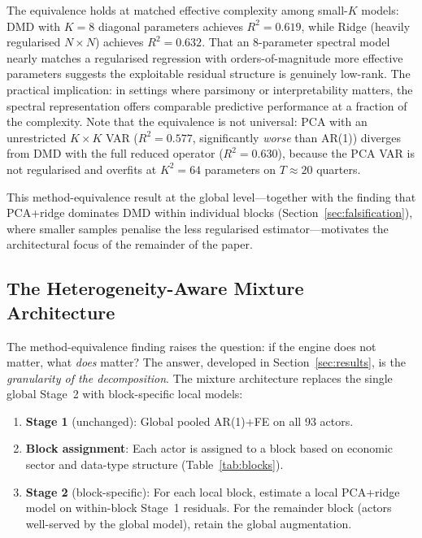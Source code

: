 \documentclass[11pt,a4paper]{article}
\begin{document}
The equivalence holds at matched effective complexity among small-$K$ models: DMD with $K = 8$ diagonal parameters achieves $R^2 = 0.619$, while Ridge (heavily regularised $N \!\times\! N$) achieves $R^2 = 0.632$. That an 8-parameter spectral model nearly matches a regularised regression with orders-of-magnitude more effective parameters suggests the exploitable residual structure is genuinely low-rank. The practical implication: in settings where parsimony or interpretability matters, the spectral representation offers comparable predictive performance at a fraction of the complexity. Note that the equivalence is not universal: PCA with an unrestricted $K \!\times\! K$ VAR ($R^2 = 0.577$, significantly \emph{worse} than AR(1)) diverges from DMD with the full reduced operator ($R^2 = 0.630$), because the PCA VAR is not regularised and overfits at $K^2 = 64$ parameters on $T \approx 20$ quarters.

This method-equivalence result at the global level---together with the finding that PCA+ridge dominates DMD within individual blocks (Section~\ref{sec:falsification}), where smaller samples penalise the less regularised estimator---motivates the architectural focus of the remainder of the paper.

\subsection{The Heterogeneity-Aware Mixture Architecture}
\label{sec:mixture_arch}

The method-equivalence finding raises the question: if the engine does not matter, what \emph{does} matter? The answer, developed in Section~\ref{sec:results}, is the \emph{granularity of the decomposition}. The mixture architecture replaces the single global Stage~2 with block-specific local models:

\begin{enumerate}[nosep]
  \item \textbf{Stage 1} (unchanged): Global pooled AR(1)+FE on all 93 actors.
  \item \textbf{Block assignment}: Each actor is assigned to a block based on economic sector and data-type structure (Table~\ref{tab:blocks}).
  \item \textbf{Stage 2} (block-specific): For each local block, estimate a local PCA+ridge model on within-block Stage~1 residuals. For the remainder block (actors well-served by the global model), retain the global augmentation.
\end{enumerate}
\end{document}
